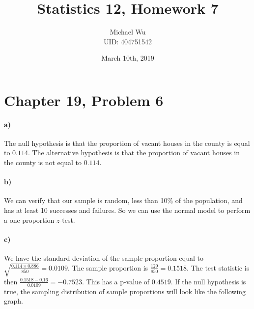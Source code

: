 \documentclass[12pt]{article}
\begin{document}
\title{Statistics 12, Homework 7}
\date{March 10th, 2019}
\author{Michael Wu\\UID: 404751542}
\maketitle

\section*{Chapter 19, Problem 6}

\paragraph{a)}

The null hypothesis is that the proportion of vacant houses in the county is equal to \(0.114\). The alternative
hypothesis is that the proportion of vacant houses in the county is not equal to \(0.114\).

\paragraph{b)}

We can verify that our sample is random, less than 10\% of the population, and has at least 10 successes and failures. So
we can use the normal model to perform a one proportion \(z\)-test.

\paragraph{c)}

We have the standard deviation of the sample proportion equal to \(\sqrt{\frac{0.114\times0.886}{850}}=0.0109\).
The sample proportion is \(\frac{129}{850}=0.1518\). The test statistic is then \(\frac{0.1518-0.16}{0.0109}=-0.7523\).
This has a p-value of \(0.4519\). If the null hypothesis is true, the sampling distribution of sample proportions will
look like the following graph.
\begin{center}
\end{center}
\end{document}
